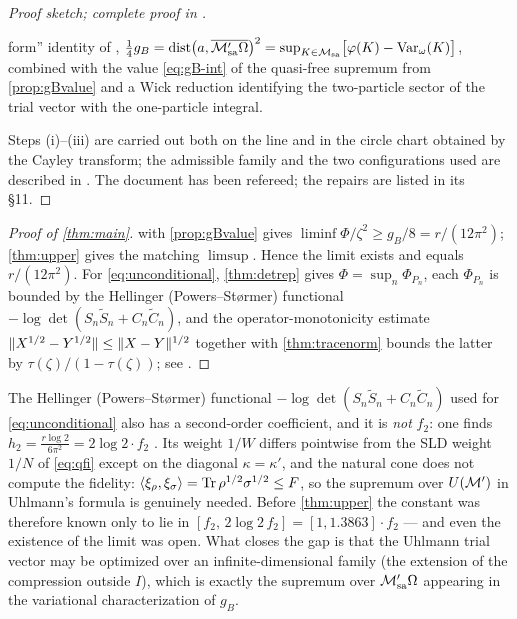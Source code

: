 \begin{proof}[Proof sketch; complete proof in {\cite[\S\S2--8]{RigorUB}}]
\begin{enumerate}[label=(\roman*)]
form'' identity of \cite{RigorSV},
$\frac14g_B=\operatorname{dist}\bigl(a,\overline{\mathcal M'_{\rm sa}\Omega}\bigr)^2
=\sup_{K\in\mathcal M_{\rm sa}}\bigl[\varphi(K)-\operatorname{Var}_\omega(K)\bigr]$,
combined with the value \eqref{eq:gB-int} of the quasi-free supremum from
\cref{prop:gBvalue} and a Wick reduction identifying the two-particle sector of
the trial vector with the one-particle integral.
\end{enumerate}
Steps (i)--(iii) are carried out both on the line and in the circle chart obtained
by the Cayley transform; the admissible family and the two configurations used are
described in \cite[\S6]{RigorUB}.  The document has been refereed; the repairs are
listed in its \S11.
\end{proof}

\begin{proof}[Proof of \cref{thm:main}]
 with \cref{prop:gBvalue} gives
$\liminf\Phi/\zeta^2\ge g_B/8=r/(12\pi^2)$; \cref{thm:upper} gives the matching
$\limsup$.  Hence the limit exists and equals $r/(12\pi^2)$.  For
\eqref{eq:unconditional}, \cref{thm:detrep} gives $\Phi=\sup_n\Phi_{P_n}$, each
$\Phi_{P_n}$ is bounded by the Hellinger (Powers--St\o rmer) functional
$-\log\det(S_n\widetilde S_n+C_n\widetilde C_n)$, and the operator-monotonicity
estimate $\lVert X^{1/2}-Y^{1/2}\rVert\le\lVert X-Y\rVert^{1/2}$ \cite[Thm.~X.1.1]{Bhatia}
together with \cref{thm:tracenorm} bounds the latter by
$\tau(\zeta)/(1-\tau(\zeta))$; see \cite[Thm.~6.3]{RigorQL}.
\end{proof}

\begin{remark}\label{rem:hellinger}
The Hellinger (Powers--St\o rmer) functional
$-\log\det(S_n\widetilde S_n+C_n\widetilde C_n)$ used for
\eqref{eq:unconditional} also has a second-order coefficient, and it is
\emph{not} $f_2$: one finds $h_2=\frac{r\log2}{6\pi^2}=2\log2\cdot f_2$
\cite[Prop.~6.5]{RigorQL}.  Its weight $1/W$ differs pointwise from the SLD weight
$1/N$ of \eqref{eq:qfi} except on the diagonal $\kappa=\kappa'$, and the natural
cone does not compute the fidelity: $\langle\xi_\rho,\xi_\sigma\rangle
=\operatorname{Tr}\rho^{1/2}\sigma^{1/2}\le F$, so the supremum over $U(\mathcal M')$ in Uhlmann's
formula is genuinely needed.  Before \cref{thm:upper} the constant was therefore
known only to lie in $[f_2,\,2\log2\,f_2]=[1,1.3863]\cdot f_2$ --- and even the
existence of the limit was open.  What closes the gap is that the Uhlmann trial
vector may be optimized over an infinite-dimensional family (the extension of the
compression outside $I$), which is exactly the supremum over $\mathcal M'_{\rm sa}\Omega$
appearing in the variational characterization of $g_B$.
\end{remark}


